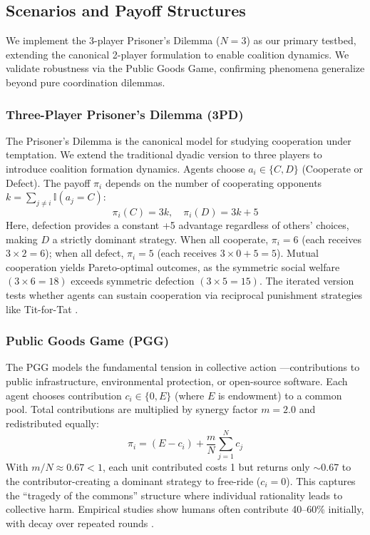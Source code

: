 \documentclass{uai2026} %
\begin{document}
\subsection{Scenarios and Payoff Structures}

We implement the 3-player Prisoner's Dilemma ($N=3$) as our primary testbed, extending the canonical 2-player formulation to enable coalition dynamics. We validate robustness via the Public Goods Game, confirming phenomena generalize beyond pure coordination dilemmas.

\subsubsection{Three-Player Prisoner's Dilemma (3PD)}

The Prisoner's Dilemma \citep{rapoport1988prisoner} is the canonical model for studying cooperation under temptation. We extend the traditional dyadic version to three players to introduce coalition formation dynamics. Agents choose $a_i \in \{C, D\}$ (Cooperate or Defect). The payoff $\pi_i$ depends on the number of cooperating opponents $k = \sum_{j \neq i} \mathbb{I}(a_j=C)$:
\begin{equation}
    \pi_i(C) = 3k, \quad \pi_i(D) = 3k + 5
\end{equation}
Here, defection provides a constant +5 advantage regardless of others' choices, making $D$ a strictly dominant strategy. When all cooperate, $\pi_i = 6$ (each receives $3 \times 2 = 6$); when all defect, $\pi_i = 5$ (each receives $3 \times 0 + 5 = 5$). Mutual cooperation yields Pareto-optimal outcomes, as the symmetric social welfare $(3 \times 6 = 18)$ exceeds symmetric defection $(3 \times 5 = 15)$. The iterated version tests whether agents can sustain cooperation via reciprocal punishment strategies like Tit-for-Tat \citep{axelrod1981evolution}.

\subsubsection{Public Goods Game (PGG)}

The PGG \citep{fehr2000cooperation,ledyard1995public} models the fundamental tension in collective action \citep{olson1965logic}—contributions to public infrastructure, environmental protection, or open-source software. Each agent chooses contribution $c_i \in \{0, E\}$ (where $E$ is endowment) to a common pool. Total contributions are multiplied by synergy factor $m=2.0$ and redistributed equally:
\begin{equation}
    \pi_i = (E - c_i) + \frac{m}{N} \sum_{j=1}^{N} c_j
\end{equation}
With $m/N \approx 0.67 < 1$, each unit contributed costs 1 but returns only $\sim$0.67 to the contributor-creating a dominant strategy to free-ride ($c_i=0$). This captures the ``tragedy of the commons'' structure where individual rationality leads to collective harm. Empirical studies show humans often contribute 40--60\% initially, with decay over repeated rounds \citep{andreoni1993rational}.
\end{document}
